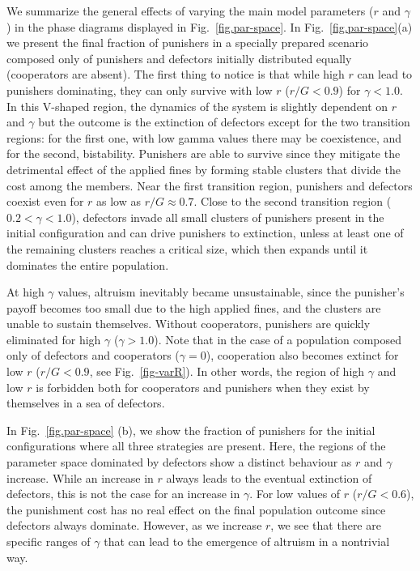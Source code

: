 \documentclass[5p]{elsarticle}
\begin{document}
We summarize the general effects of varying the main model parameters ($ r $ and $ \gamma $) in the phase diagrams displayed in Fig.~\ref{fig.par-space}.
%
In Fig.~\ref{fig.par-space}(a) we present the final fraction of punishers in a specially prepared scenario composed only of punishers and defectors initially distributed equally (cooperators are absent). The first thing to notice is that while high $r$ can lead to punishers dominating, they can only survive with low $r$ ($r/G<0.9$) for $\gamma<1.0$. In this V-shaped region, the dynamics of the system is slightly dependent on $r$ and $\gamma$ but the outcome is the extinction of defectors except for the two transition regions: for the first one, with low gamma values there may be coexistence, and for the second, bistability. Punishers are able to survive since they mitigate the detrimental effect of the applied fines by forming stable clusters that divide the cost among the members. Near the first transition region, punishers and defectors coexist even for $r$ as low as $r/G \approx 0.7$. 
%
Close to the second transition region  ($0.2<\gamma<1.0$),  defectors invade all small clusters of punishers present in the initial configuration and can drive punishers to extinction, unless at least one of the remaining clusters reaches a critical size, which then expands until it dominates the entire population.


At high $\gamma$ values, altruism inevitably became unsustainable, since the punisher's payoff becomes too small  due to the high applied fines, and the clusters are unable to sustain themselves. Without cooperators, punishers are quickly eliminated for high $\gamma$ ($\gamma>1.0$). 
%
Note that in the case of a population composed only of defectors and cooperators ($\gamma = 0$), cooperation also becomes extinct for low $r$ ($r/G < 0.9$, see Fig.~\ref{fig-varR}). In other words, the region of high $\gamma$ and low $r$ is forbidden both for cooperators and punishers when they exist by themselves in a sea of defectors.

 In Fig.~\ref{fig.par-space} (b), we show the fraction of punishers for the initial configurations where all three strategies are present. Here, the regions of the parameter space dominated by defectors show a distinct behaviour as $r$ and $\gamma$ increase. While an increase in $r$ always leads to the eventual extinction of defectors, this is not the case for an increase in $\gamma$. For low values of $r$ ($r/G<0.6$), the punishment cost has no real effect on the final population outcome since defectors always dominate. However, as we increase $r$, we see that there are specific ranges of $\gamma$ that can lead to the emergence of altruism in a nontrivial way.
%
\end{document}
